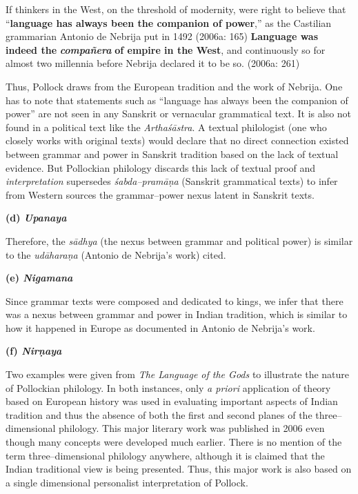 \begin{myquote}
If thinkers in the West, on the threshold of modernity, were right to believe that “\textbf{language has always been the companion of power},” as the Castilian grammarian Antonio de Nebrija put in 1492 (2006a: 165) \textbf{Language was indeed the} {\it {\bfseries compañera}} \textbf{of empire in the West}, and continuously so for almost two millennia before Nebrija declared it to be so. (2006a: 261)
\end{myquote}
Thus, Pollock draws from the European tradition and the work of Nebrija. One has to note that statements such as “language has always been the companion of power” are not seen in any Sanskrit or vernacular grammatical text. It is also not found in a political text like the \textit{Arthaśāstra}. A textual philologist (one who closely works with original texts) would declare that no direct connection existed between grammar and power in Sanskrit tradition based on the lack of textual evidence. But Pollockian philology discards this lack of textual proof and \textit{interpretation} supersedes \textit{śabda–pramāṇa} (Sanskrit grammatical texts) to infer from Western sources the grammar–power nexus latent in Sanskrit texts.

\textbf{(d) \textit{Upanaya}}

Therefore, the \textit{sādhya} (the nexus between grammar and political power) is similar to the \textit{udāharaṇa} (Antonio de Nebrija’s work) cited.

\textbf{(e) \textit{Nigamana}}

Since grammar texts were composed and dedicated to kings, we infer that there was a nexus between grammar and power in Indian tradition, which is similar to how it happened in Europe as documented in Antonio de Nebrija’s work.

\textbf{(f) \textit{Nirṇaya}}

Two examples were given from \textit{The Language of the Gods} to illustrate the nature of Pollockian philology. In both instances, only \textit{a priori} application of theory based on European history was used in evaluating important aspects of Indian tradition and thus the absence of both the first and second planes of the three–dimensional philology. This major literary work was published in 2006 even though many concepts were developed much earlier. There is no mention of the term three–dimensional philology anywhere, although it is claimed that the Indian traditional view is being presented. Thus, this major work is also based on a single dimensional personalist interpretation of Pollock.

